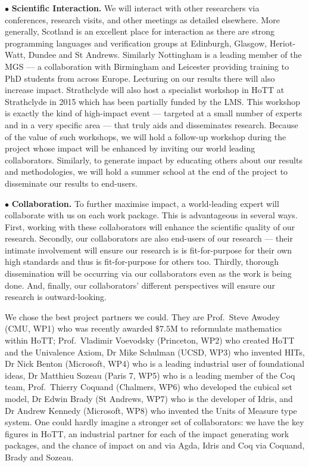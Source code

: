 \documentclass[a4paper,11pt]{article}
\begin{document}
\vspace*{0.02in} $\bullet$ {\bf Scientific Interaction.} We will
interact with other researchers via conferences,
research visits, and other meetings as detailed elsewhere. More
generally, Scotland is an excellent place for interaction as there are
strong programming languages and verification groups at Edinburgh,
Glasgow, Heriot-Watt, Dundee and St Andrews. Similarly Nottingham is a
leading member of the MGS --- a collaboration with Birmingham and
Leicester providing training to PhD students
from across Europe. Lecturing on our results there will also increase
impact. Strathclyde will also host a specialist
workshop in HoTT at Strathclyde in 2015 which has been partially
funded by the LMS. This workshop is exactly the kind of high-impact
event --- targeted at a small number of experts and in a very specific
area --- that truly aids and disseminates research. Because of the
value of such workshops, we will hold a follow-up workshop during
the project whose impact will be enhanced by inviting our
world leading collaborators. Similarly, to generate impact by
educating others about our results and methodologies, we will hold a
summer school at the end of the project to disseminate our results to
end-users.

\vspace*{0.02in}

$\bullet$ {\bf Collaboration.} To further maximise impact, a
world-leading expert will collaborate with us on each work package.
This is advantageous in several ways. First, working with these
collaborators will enhance the scientific quality of our
research. Secondly, our collaborators are also end-users of our
research --- their intimate involvement will ensure our research is is
fit-for-purpose for their own high standards and thus is
fit-for-purpose for others too. Thirdly, thorough dissemination will
be occurring via our collaborators even as the work is being
done. And, finally, our collaborators' different perspectives will
ensure our research is outward-looking.

We chose the best project partners we could. They are Prof.\ Steve
Awodey (CMU, WP1) who was recently awarded $\$7.5$M to reformulate
mathematics within HoTT; Prof.\ Vladimir Voevodsky (Princeton, WP2)
who created HoTT and the Univalence Axiom, Dr Mike Schulman (UCSD,
WP3) who invented HITs, Dr Nick Benton (Microsoft, WP4) who is a
leading industrial user of foundational ideas, Dr Matthieu Sozeau
(Paris 7, WP5) who is a leading member of the Coq team, Prof.\ Thierry
Coquand (Chalmers, WP6) who developed the cubical set model, Dr Edwin
Brady (St Andrews, WP7) who is the developer of Idris, and Dr Andrew
Kennedy (Microsoft, WP8) who invented the Units of Measure type
system. One could hardly imagine a stronger set of collaborators: we
have the key figures in HoTT, an industrial partner for each of the
impact generating work packages, and the chance of impact on and via
Agda, Idris and Coq via Coquand, Brady and Sozeau.
\end{document}
